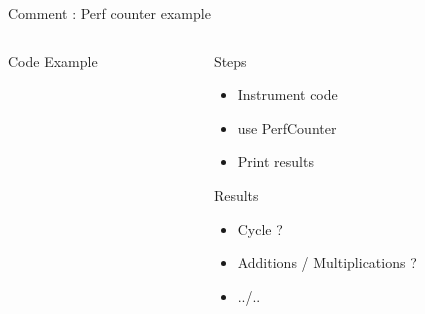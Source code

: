 \begin{frame}[fragile]{Comment : Perf counter example}

  \begin{columns}[t]
   \begin{column}{\BW}
     \begin{block}{Code Example}

     \end{block}
   \end{column}
   \begin{column}{\BW}
     \begin{block}{Steps}
       \begin{itemize}
       \item Instrument code
       \item use PerfCounter
       \item Print results
       \end{itemize}
     \end{block}
     \begin{block}{Results}
       \begin{itemize}
       \item Cycle ?
       \item Additions / Multiplications ?
       \item ../..
       \end{itemize}
     \end{block}
   \end{column}
  \end{columns}
\end{frame}
%


